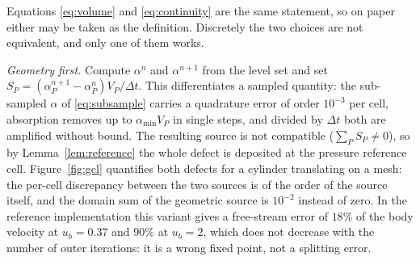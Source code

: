 \documentclass[11pt,a4paper]{article}
\theoremstyle{remark}
\newcommand{\dt}{\Delta t}
\begin{document}
Equations \eqref{eq:volume} and \eqref{eq:continuity} are the same statement, so on paper
either may be taken as the definition. Discretely the two choices are not equivalent, and
only one of them works.

\emph{Geometry first.} Compute $\alpha^n$ and $\alpha^{n+1}$ from the level set and set
$S_P=(\alpha^{n+1}_P-\alpha^n_P)V_P/\dt$. This differentiates a sampled quantity: the
sub-sampled $\alpha$ of \eqref{eq:subsample} carries a quadrature error of order $10^{-3}$ per
cell, absorption removes up to $\alpha_{\min}V_P$ in single steps, and divided by $\dt$ both
are amplified without bound. The resulting source is not compatible ($\sum_PS_P\neq0$), so by
Lemma~\ref{lem:reference} the whole defect is deposited at the pressure reference cell.
Figure~\ref{fig:gcl} quantifies both defects for a cylinder translating on a mesh: the
per-cell discrepancy between the two sources is of the order of the source itself, and the
domain sum of the geometric source is $10^{-2}$ instead of zero. In the reference
implementation this variant gives a free-stream error of $18\%$ of the body velocity at
$u_b=0.37$ and $90\%$ at $u_b=2$, which does not decrease with the number of outer iterations:
it is a wrong fixed point, not a splitting error.
\end{document}
